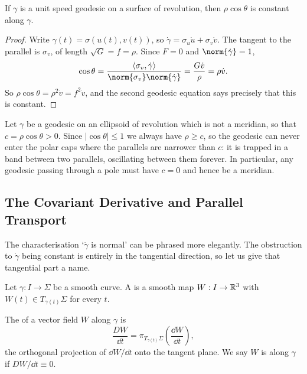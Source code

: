 \documentclass[a4paper]{scrartcl}
\begin{document}
\begin{theorem}
    If $\gamma$ is a unit speed geodesic on a surface of revolution, then $\rho \cos \theta$ is constant along $\gamma$.
\end{theorem}
\begin{proof}
    Write $\gamma(t) = \sigma(u(t), v(t))$, so $\dot\gamma = \sigma_u \dot u + \sigma_v\dot v$. The tangent to the parallel is $\sigma_v$, of length $\sqrt{G} = f = \rho$. Since $F = 0$ and $\norm{\dot\gamma} = 1$,
    $$
    \cos\theta = \frac{\langle \sigma_v, \dot\gamma\rangle}{\norm{\sigma_v}\norm{\dot\gamma}} = \frac{G\dot v}{\rho} = \rho\dot v.
    $$
    So $\rho\cos\theta = \rho^2 \dot v = f^2 \dot v$, and the second geodesic equation says precisely that this is constant.
\end{proof}

\begin{example}
    Let $\gamma$ be a geodesic on an ellipsoid of revolution which is not a meridian, so that $c = \rho\cos\theta > 0$. Since $|\cos\theta| \leq 1$ we always have $\rho \geq c$, so the geodesic can never enter the polar caps where the parallels are narrower than $c$: it is trapped in a band between two parallels, oscillating between them forever. In particular, any geodesic passing through a pole must have $c = 0$ and hence be a meridian.
\end{example}

\subsection{The Covariant Derivative and Parallel Transport}

The characterisation `$\ddot\gamma$ is normal' can be phrased more elegantly. The obstruction to $\dot\gamma$ being constant is entirely in the tangential direction, so let us give that tangential part a name.

\begin{definition}
    Let $\gamma: I \rightarrow \Sigma$ be a smooth curve. A  is a smooth map $W: I \rightarrow \mathbb{R}^3$ with $W(t) \in T_{\gamma(t)}\Sigma$ for every $t$.
\end{definition}

\begin{definition}
    The  of a vector field $W$ along $\gamma$ is
    $$
    \frac{DW}{\dd t} = \pi_{T_{\gamma(t)}\Sigma}\left(\frac{\dd W}{\dd t}\right),
    $$
    the orthogonal projection of $\dd W/\dd t$ onto the tangent plane. We say $W$ is  along $\gamma$ if $DW/\dd t \equiv 0$.
\end{definition}
\end{document}

